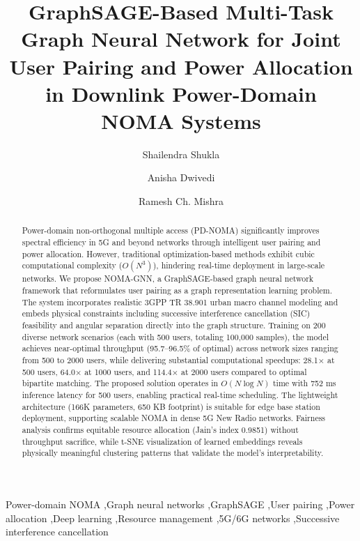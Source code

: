 \documentclass[review,3p]{elsarticle}
\begin{document}
\begin{frontmatter}

\title{GraphSAGE-Based Multi-Task Graph Neural Network for Joint User Pairing and Power Allocation in Downlink Power-Domain NOMA Systems}

\author[inst1]{Shailendra Shukla}

\author[inst1]{Anisha Dwivedi}

\author[inst1]{Ramesh Ch. Mishra}

\address[inst1]{Department of Electronics and Communication Engineering, Indian Institute of Information Technology, Senapati, Manipur 795002, India}


\begin{abstract}
Power-domain non-orthogonal multiple access (PD-NOMA) significantly improves spectral efficiency in 5G and beyond networks through intelligent user pairing and power allocation. However, traditional optimization-based methods exhibit cubic computational complexity ($O(N^3)$), hindering real-time deployment in large-scale networks. We propose NOMA-GNN, a GraphSAGE-based graph neural network framework that reformulates user pairing as a graph representation learning problem. The system incorporates realistic 3GPP TR 38.901 urban macro channel modeling and embeds physical constraints including successive interference cancellation (SIC) feasibility and angular separation directly into the graph structure. Training on 200 diverse network scenarios (each with 500 users, totaling 100,000 samples), the model achieves near-optimal throughput (95.7--96.5\% of optimal) across network sizes ranging from 500 to 2000 users, while delivering substantial computational speedups: 28.1× at 500 users, 64.0× at 1000 users, and 114.4× at 2000 users compared to optimal bipartite matching. The proposed solution operates in $O(N \log N)$ time with 752 ms inference latency for 500 users, enabling practical real-time scheduling. The lightweight architecture (166K parameters, 650 KB footprint) is suitable for edge base station deployment, supporting scalable NOMA in dense 5G New Radio networks. Fairness analysis confirms equitable resource allocation (Jain's index 0.9851) without throughput sacrifice, while t-SNE visualization of learned embeddings reveals physically meaningful clustering patterns that validate the model's interpretability.
\end{abstract}

\begin{keyword}
Power-domain NOMA \sep Graph neural networks \sep GraphSAGE \sep User pairing \sep Power allocation \sep Deep learning \sep Resource management \sep 5G/6G networks \sep Successive interference cancellation
\end{keyword}

\end{frontmatter}
\end{document}
